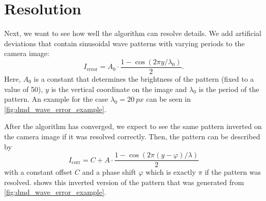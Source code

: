 \section{Resolution}
\label{sec:dmd_results_resolution}
Next, we want to see how well the algorithm can resolve details. We add artificial deviations that contain sinusoidal wave patterns with varying periods to the camera image:
\begin{equation*}
    I_\text{error} =  A_0 \cdot \frac{1-\cos(2\pi y / \lambda_0)}{2}.
\end{equation*}
Here, $A_0$ is a constant that determines the brightness of the pattern (fixed to a value of 50), $y$ is the vertical coordinate on the image and $\lambda_0$ is the period of the pattern. An example for the case $\lambda_0=\SI{20}{px}$ can be seen in \cref{fig:dmd_wave_error_example}.

After the algorithm has converged, we expect to see the same pattern inverted on the camera image if it was resolved correctly. Then, the pattern can be described by 
\begin{equation} \label{eq:dmd_wave_result}
    I_\text{corr} = C + A \cdot \frac{1 - \cos(2\pi (y-\varphi) / \lambda)}{2}
\end{equation}
with a constant offset $C$ and a phase shift $\varphi$ which is exactly $\pi$ if the pattern was resolved.  shows this inverted version of the pattern that was generated from \cref{fig:dmd_wave_error_example}.

